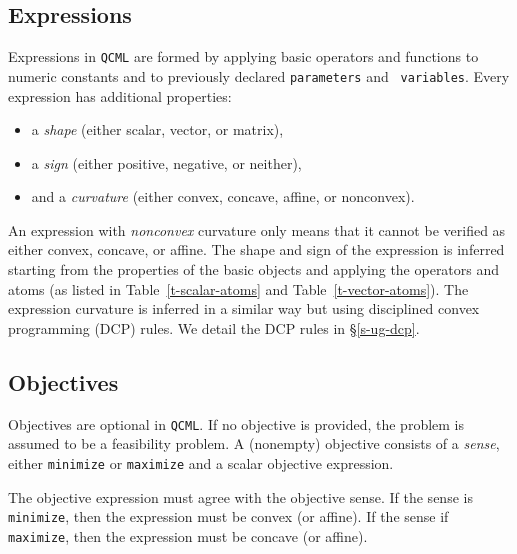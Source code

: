 \documentclass[11pt]{article}
\def\qcml{\texttt{QCML}\xspace}
\newcommand{\reals}{{\mbox{\bf R}}}
\begin{document}
\subsection{Expressions}
Expressions in \qcml are formed by applying basic operators and functions to
numeric constants and to previously declared {\tt parameters} and {\tt
variables}. Every expression has additional properties:
\begin{itemize}
\item a \emph{shape} (either scalar, vector, or matrix),
\item a \emph{sign} (either positive, negative, or neither),
\item and a \emph{curvature} (either convex, concave, affine, or nonconvex).
\end{itemize}
An expression with \emph{nonconvex} curvature only means that it cannot be
verified as either convex, concave, or affine. The shape and sign of the
expression is inferred starting from the properties of the basic objects and
applying the operators and atoms (as listed in
Table~\ref{t-scalar-atoms} and Table~\ref{t-vector-atoms}). The expression curvature is
inferred in a similar way but using disciplined convex programming (DCP)
rules. We detail the DCP rules in \S\ref{s-ug-dcp}.


% 
% 
% 
% 
% 


\subsection{Objectives}
Objectives are optional in \qcml. If no objective is provided, the problem
is assumed to be a feasibility problem. A (nonempty) objective consists of a
\emph{sense}, either {\tt minimize} or {\tt maximize} and a scalar objective 
expression.

The objective expression must agree with the objective sense. 
If the sense is {\tt minimize}, then the expression must be convex (or affine).
If the sense if {\tt maximize}, then the expression must be concave (or affine). 
\end{document}
